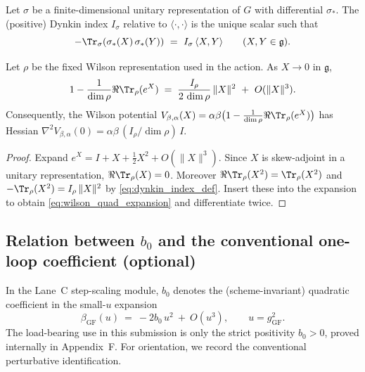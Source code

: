 \begin{definition}
\label{def:dynkin_index}
Let $\sigma$ be a finite-dimensional unitary representation of $G$ with differential $\sigma_\ast$.
The (positive) Dynkin index $I_\sigma$ relative to $\langle\cdot,\cdot\rangle$ is the unique scalar such that
\begin{equation}
\label{eq:dynkin_index_def}
-\Tr_{\sigma}(\sigma_\ast(X)\,\sigma_\ast(Y))\ =\ I_\sigma\,\langle X,Y\rangle\qquad (X,Y\in\mathfrak g).
\end{equation}
\end{definition}

\begin{lemma}
\label{lem:wilson_quadratic_coefficient}
Let $\rho$ be the fixed Wilson representation used in the action.
As $X\to 0$ in $\mathfrak g$,
\begin{equation}
\label{eq:wilson_quad_expansion}
1-\frac{1}{\dim\rho}\Re\Tr_{\rho}(e^X)
\;=\;\frac{I_\rho}{2\,\dim\rho}\,\|X\|^2\ +\ O(\|X\|^3).
\end{equation}
Consequently, the Wilson potential
$V_{\beta,\alpha}(X)=\alpha\beta\bigl(1-\frac{1}{\dim\rho}\Re\Tr_{\rho}(e^X)\bigr)$ has Hessian
$\nabla^2 V_{\beta,\alpha}(0)=\alpha\beta\,(I_\rho/\dim\rho)\,I$.
\end{lemma}

\begin{proof}
Expand $e^X=I+X+\tfrac12X^2+O(\|X\|^3)$.
Since $X$ is skew-adjoint in a unitary representation, $\Re\Tr_\rho(X)=0$.
Moreover $\Re\Tr_\rho(X^2)=\Tr_\rho(X^2)$ and
$-\Tr_\rho(X^2)=I_\rho\,\|X\|^2$ by \eqref{eq:dynkin_index_def}.
Insert these into the expansion to obtain \eqref{eq:wilson_quad_expansion} and differentiate twice.
\end{proof}

\subsection{Relation between \texorpdfstring{$b_0$}{b0} and the conventional one-loop coefficient (optional)}

In the Lane~C step-scaling module, $b_0$ denotes the (scheme-invariant) quadratic coefficient in the small-$u$ expansion
\begin{equation}
\beta_{\mathrm{GF}}(u)\ =\ -2b_0\,u^2\ +\ O(u^3),
\qquad u=g^2_{\mathrm{GF}}.
\end{equation}
The load-bearing use in this submission is only the strict positivity $b_0>0$, proved internally in Appendix~F.
For orientation, we record the conventional perturbative identification.

